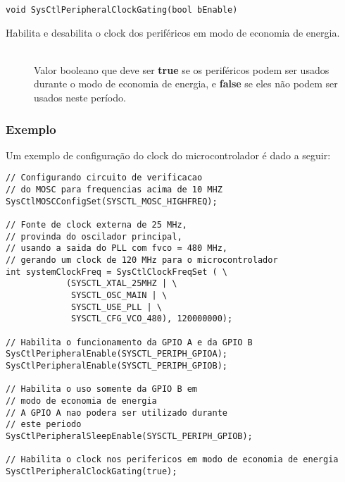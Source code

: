 \begin{lstlisting}[style=funcao]
	void SysCtlPeripheralClockGating(bool bEnable)
\end{lstlisting}

Habilita e desabilita o clock dos periféricos em modo de economia de energia.

\begin{description}
	\item []\hfill \\
	Valor booleano que deve ser \textbf{true} se os periféricos podem ser usados durante o modo de economia de energia, e \textbf{false} se eles não podem ser usados neste período.
	
\end{description}



\subsubsection{Exemplo}

Um exemplo de configuração do clock do microcontrolador é dado a seguir:

\begin{lstlisting}[style=citacao]
// Configurando circuito de verificacao 
// do MOSC para frequencias acima de 10 MHZ
SysCtlMOSCConfigSet(SYSCTL_MOSC_HIGHFREQ);

// Fonte de clock externa de 25 MHz,
// provinda do oscilador principal,
// usando a saida do PLL com fvco = 480 MHz,
// gerando um clock de 120 MHz para o microcontrolador
int systemClockFreq = SysCtlClockFreqSet ( \
			(SYSCTL_XTAL_25MHZ | \
			 SYSCTL_OSC_MAIN | \
			 SYSCTL_USE_PLL | \
			 SYSCTL_CFG_VCO_480), 120000000);

// Habilita o funcionamento da GPIO A e da GPIO B
SysCtlPeripheralEnable(SYSCTL_PERIPH_GPIOA);
SysCtlPeripheralEnable(SYSCTL_PERIPH_GPIOB);

// Habilita o uso somente da GPIO B em 
// modo de economia de energia
// A GPIO A nao podera ser utilizado durante 
// este periodo
SysCtlPeripheralSleepEnable(SYSCTL_PERIPH_GPIOB);

// Habilita o clock nos perifericos em modo de economia de energia
SysCtlPeripheralClockGating(true);

\end{lstlisting}

